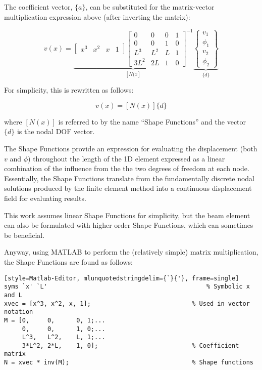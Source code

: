 \documentclass[a4paper]{article}
\begin{document}
The coefficient vector, $\{a\}$, can be substituted for the matrix-vector multiplication expression above (after inverting the matrix):

\begin{equation*}
v(x) =
\underbrace{
    \begin{bmatrix}
        x^{3} & x^{2} & x & 1
    \end{bmatrix}
    \begin{bmatrix}
        0 & 0 & 0 & 1\\
        0 & 0 & 1 & 0\\
        L^{3} & L^{2} & L & 1\\
        3L^{2} & 2L & 1 & 0
    \end{bmatrix}^{-1}
}_{\left[N({x}\right]}
\underbrace{
    \begin{Bmatrix}
        v_{1} \\ \phi_{1} \\ v_{2} \\ \phi_{2}
    \end{Bmatrix}
}_{\{d\}}
\end{equation*}

For simplicity, this is rewritten as follows:

\begin{equation*}
    v(x) = \left[N(x)\right]\{d\}
\end{equation*}

where $\left[N(x)\right]$ is referred to by the name ``Shape Functions'' and the vector $\{d\}$ is the nodal DOF vector.

The Shape Functions provide an expression for evaluating the displacement (both $v$ and $\phi$) throughout the length of the 1D element expressed as a linear combination of the influence from the the two degrees of freedom at each node. Essentially, the Shape Functions translate from the fundamentally discrete nodal solutions produced by the finite element method into a continuous displacement field for evaluating results.

This work assumes linear Shape Functions for simplicity, but the beam element can also be formulated with higher order Shape Functions, which can sometimes be beneficial.

Anyway, using MATLAB to perform the (relatively simple) matrix multiplication, the Shape Functions are found as follows:

\begin{lstlisting}[style=Matlab-Editor, mlunquotedstringdelim={`}{'}, frame=single]
syms `x' `L'                                            % Symbolic x and L
xvec = [x^3, x^2, x, 1];                            % Used in vector notation
M = [0,     0,      0, 1;...
     0,     0,      1, 0;...
     L^3,   L^2,    L, 1;...
     3*L^2, 2*L,    1, 0];                          % Coefficient matrix
N = xvec * inv(M);                                  % Shape functions
\end{lstlisting}
\end{document}

